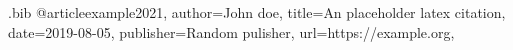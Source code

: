 \begin{filecontents}[overwrite]{\jobname.bib}
@article{example2021,
	author={John doe},
	title={An placeholder latex citation},
	date={2019-08-05},
	publisher={Random pulisher},
	url={https://example.org},
}
\end{filecontents}
